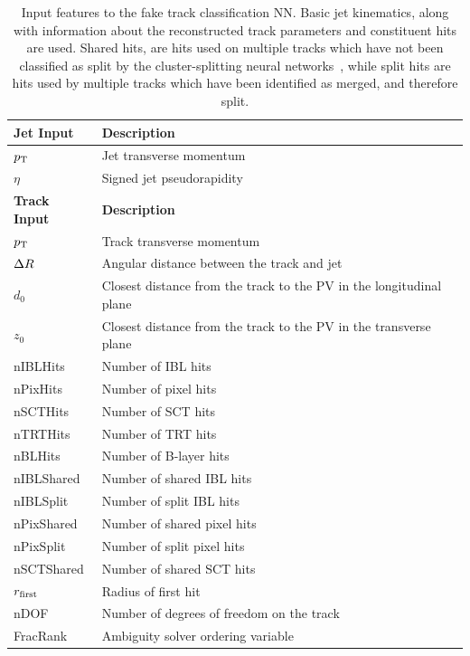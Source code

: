 \begin{table}[!htbp]
  \footnotesize\centering
  \setlength{\tabcolsep}{0.5em} %
  \begin{tabular}{ll}
    \toprule\hline
    \textbf{Jet Input} & \textbf{Description} \\
    \hline
    $p_{\text{T}}$ & Jet transverse momentum \\
    $\eta$ & Signed jet pseudorapidity \\
    \toprule
    \textbf{Track Input} & \textbf{Description} \\
    \hline
    $p_{\text{T}}$ & Track transverse momentum \\
    $\Delta R$ & Angular distance between the track and jet \\
    $d_0$  & Closest distance from the track to the PV in the longitudinal plane \\
    $z_0$  & Closest distance from the track to the PV in the transverse plane \\
    nIBLHits   & Number of IBL hits \\
    nPixHits   & Number of pixel hits \\
    nSCTHits   & Number of SCT hits \\
    nTRTHits   & Number of TRT hits \\
    nBLHits    & Number of B-layer hits \\
    nIBLShared & Number of shared IBL hits \\
    nIBLSplit  & Number of split IBL hits \\
    nPixShared & Number of shared pixel hits \\
    nPixSplit  & Number of split pixel hits \\
    nSCTShared & Number of shared SCT hits \\
    $r_{\textnormal{first}}$      & Radius of first hit \\
    nDOF   & Number of degrees of freedom on the track \\
    FracRank & Ambiguity solver ordering variable \\
    \hline\bottomrule
  \end{tabular}
  \caption{
    Input features to the fake track classification NN.
    Basic jet kinematics, along with information about the reconstructed track parameters and constituent hits are used.
    Shared hits, are hits used on multiple tracks which have not been classified as split by the cluster-splitting neural networks~\cite{PERF-2015-08}, while split hits are hits used by multiple tracks which have been identified as merged, and therefore split.
  }
  \label{tab:fake_mva_track_inputs}
\end{table}

